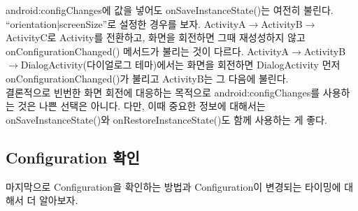 android:configChanges에 값을 넣어도 onSaveInstanceState()는 여전히 불린다. ``orientation|screenSize''로 설정한 경우를 보자.
ActivityA$\rightarrow$ActivityB$\rightarrow$ActivityC로 Activity를 전환하고, 화면을 회전하면 그때 재성성하지 않고 onConfigurationChanged() 메서드가 불리는 것이 다르다.
ActivityA$\rightarrow$ActivityB$\rightarrow$DialogActivity(다이얼로그 테마)에서는 화면을 회전하면 DialogActivity 먼저 onConfigurationChanged()가 불리고 ActivityB는 그 다음에 불린다.\\

결론적으로 빈번한 화면 회전에 대응하는 목적으로 android:configChanges를 사용하는 것은 나쁜 선택은 아니다.
다만, 이때 중요한 정보에 대해서는 onSaveInstanceState()와  onRestoreInstanceState()도 함께 사용하는 게 좋다.\\

\subsection{Configuration 확인}
마지막으로 Configuration을 확인하는 방법과 Configuration이 변경되는 타이밍에 대해서 더 알아보자.\\
 
